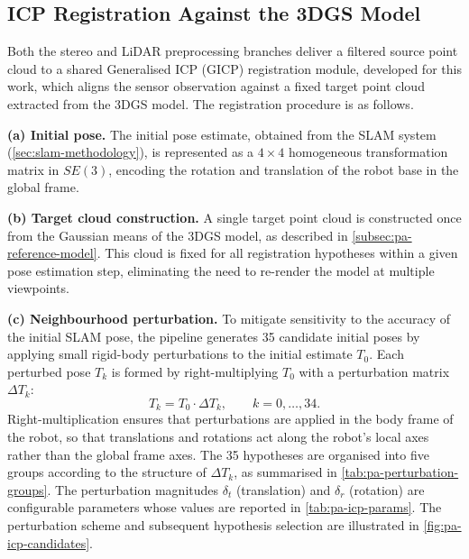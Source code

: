 \subsection{ICP Registration Against the 3DGS Model}
\label{subsec:pa-icp-registration}

Both the stereo and LiDAR preprocessing branches deliver a filtered source point cloud to a shared Generalised ICP (GICP) registration module, developed for this work, which aligns the sensor observation against a fixed target point cloud extracted from the 3DGS model. The registration procedure is as follows.

\textbf{(a) Initial pose.} The initial pose estimate, obtained from the SLAM system (\cref{sec:slam-methodology}), is represented as a $4 \times 4$ homogeneous transformation matrix in $SE(3)$, encoding the rotation and translation of the robot base in the global frame.

\textbf{(b) Target cloud construction.} A single target point cloud is constructed once from the Gaussian means of the 3DGS model, as described in \cref{subsec:pa-reference-model}. This cloud is fixed for all registration hypotheses within a given pose estimation step, eliminating the need to re-render the model at multiple viewpoints.

\textbf{(c) Neighbourhood perturbation.} To mitigate sensitivity to the accuracy of the initial SLAM pose, the pipeline generates 35 candidate initial poses by applying small rigid-body perturbations to the initial estimate $T_0$. Each perturbed pose $T_k$ is formed by right-multiplying $T_0$ with a perturbation matrix $\Delta T_k$:
%
\begin{equation}
    T_k = T_0 \cdot \Delta T_k, \qquad k = 0, \ldots, 34.
    \label{eq:perturbation}
\end{equation}
%
Right-multiplication ensures that perturbations are applied in the body frame of the robot, so that translations and rotations act along the robot's local axes rather than the global frame axes. The 35 hypotheses are organised into five groups according to the structure of $\Delta T_k$, as summarised in \cref{tab:pa-perturbation-groups}. The perturbation magnitudes $\delta_t$ (translation) and $\delta_r$ (rotation) are configurable parameters whose values are reported in \cref{tab:pa-icp-params}. The perturbation scheme and subsequent hypothesis selection are illustrated in \cref{fig:pa-icp-candidates}.

